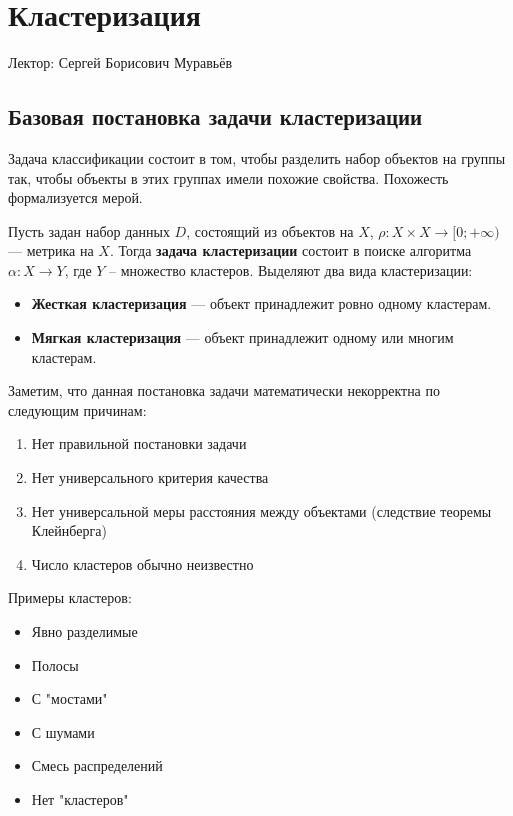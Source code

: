 \chapter{Кластеризация}

Лектор: Сергей Борисович Муравьёв

\section{Базовая постановка задачи кластеризации}

Задача классификации состоит в том, чтобы разделить набор объектов на группы так, чтобы объекты в этих группах имели похожие свойства. Похожесть формализуется мерой.

\begin{definition}
    Пусть задан набор данных $D$, состоящий из объектов на $X$, $\rho:X\times X\to[0;+\infty)$ --- метрика на $X$. Тогда \textbf{задача кластеризации} состоит в поиске алгоритма $\alpha:X\to Y$, где $Y$ -- множество кластеров. Выделяют два вида кластеризации:
    \begin{itemize}
        \item \textbf{Жесткая кластеризация} --- объект принадлежит ровно одному кластерам.
        \item \textbf{Мягкая кластеризация} --- объект принадлежит одному или многим кластерам.
    \end{itemize}
\end{definition}

Заметим, что данная постановка задачи математически некорректна по следующим причинам:
\begin{enumerate}
    \item Нет правильной постановки задачи
    \item Нет универсального критерия качества
    \item Нет универсальной меры расстояния между объектами (следствие теоремы Клейнберга)
    \item Число кластеров обычно неизвестно
\end{enumerate}

Примеры кластеров:
\begin{itemize}
    \item Явно разделимые
    \item Полосы
    \item С "мостами"
    \item С шумами
    \item Смесь распределений
    \item Нет "кластеров"
\end{itemize}


